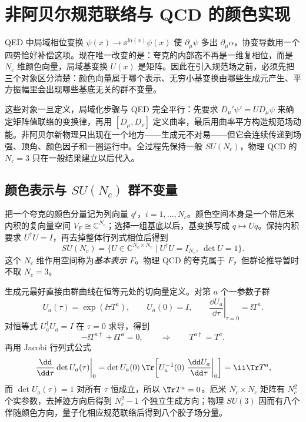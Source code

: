 \section{非阿贝尔规范联络与 QCD 的颜色实现}\label{sec:qcd-group-gauge-dp10}

QED 中局域相位变换 $\psi(x)\to \ee^{\ii\alpha(x)}\psi(x)$ 使 $\partial_\mu\psi$ 多出 $\partial_\mu\alpha$，协变导数用一个四势恰好补偿这项。现在唯一改变的是：夸克的内部态不再是一维复相位，而是 $N_c$ 维颜色向量，局域基变换 $U(x)$ 是矩阵。因此在引入规范场之前，必须先把三个对象区分清楚：颜色向量属于哪个表示、无穷小基变换由哪些生成元产生、平方振幅里会出现哪些基底无关的群不变量。

这些对象一旦定义，局域化步骤与 QED 完全平行：先要求 $D_\mu'\psi'=UD_\mu\psi$ 来确定矩阵值联络的变换律，再用 $[D_\mu,D_\nu]$ 定义曲率，最后用曲率平方构造规范场动能。非阿贝尔新物理只出现在一个地方——生成元不对易——但它会连续传递到场强、顶角、颜色因子和一圈运行中。全过程先保持一般 $SU(N_c)$，物理 QCD 的 $N_c=3$ 只在一般结果建立以后代入。

\subsection{颜色表示与 $SU(N_c)$ 群不变量}

把一个夸克的颜色分量记为列向量 $q^i$，$i=1,\ldots,N_c$。颜色空间本身是一个带厄米内积的复向量空间 $V_F\cong\mathbb C^{N_c}$；选择一组基底以后，基变换写成 $q\mapsto Uq$。保持内积要求 $U^\dagger U=I$，再去掉整体行列式相位后得到
\begin{equation}
 \boxed{
 SU(N_c)=\{U\in\mathbb C^{N_c\times N_c}\mid U^\dagger U=I_{N_c},\ \det U=1\}.}
 \label{eq:SUN-definition-dp10}
\end{equation}
这个 $N_c$ 维作用空间称为\emph{基本表示} $F$。物理 QCD 的夸克属于 $F$，但群论推导暂时不取 $N_c=3$。

生成元最好直接由群曲线在恒等元处的切向量定义。对第 $a$ 个一参数子群
\begin{equation*}
 U_a(\tau)=\exp(\ii\tau T^a),
 \qquad U_a(0)=I,
 \qquad
 \left.\frac{\dd U_a}{\dd\tau}\right|_{\tau=0}=\ii T^a .
\end{equation*}
对恒等式 $U_a^\dagger U_a=I$ 在 $\tau=0$ 求导，得到
\begin{equation*}
 -\ii T^{a\dagger}+\ii T^a=0,
 \qquad\Longrightarrow\qquad T^{a\dagger}=T^a.
\end{equation*}
再用 Jacobi 行列式公式
\begin{equation*}
 \left.\frac{\dd}{\dd\tau}\det U_a(\tau)\right|_{0}
 =\det U_a(0)\,
 \Tr\!\left[U_a^{-1}(0)\left.\frac{\dd U_a}{\dd\tau}\right|_0\right]
 =\ii\Tr T^a,
\end{equation*}
而 $\det U_a(\tau)=1$ 对所有 $\tau$ 恒成立，所以 $\Tr T^a=0$。厄米 $N_c\times N_c$ 矩阵有 $N_c^2$ 个实参数，去掉迹方向后得到 $N_c^2-1$ 个独立生成方向；物理 $SU(3)$ 因而有八个伴随颜色方向，量子化相应规范联络后得到八个胶子场分量。

